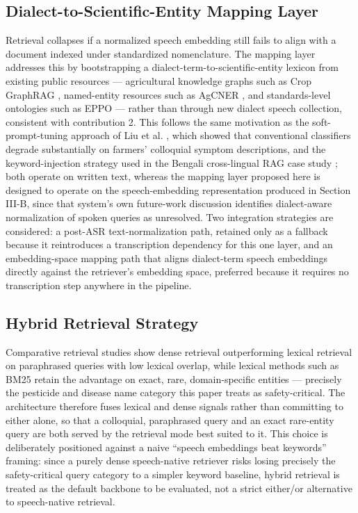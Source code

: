 \documentclass[conference]{IEEEtran}
\begin{document}
\subsection{Dialect-to-Scientific-Entity Mapping Layer}
Retrieval collapses if a normalized speech embedding still fails to align with a document indexed under standardized nomenclature. The mapping layer addresses this by bootstrapping a dialect-term-to-scientific-entity lexicon from existing public resources --- agricultural knowledge graphs such as Crop GraphRAG \cite{wu2026cropgraphrag}, named-entity resources such as AgCNER \cite{yao2024agcner}, and standards-level ontologies such as EPPO \cite{kgeditorial2023} --- rather than through new dialect speech collection, consistent with contribution 2. This follows the same motivation as the soft-prompt-tuning approach of Liu et al. \cite{liu2025colloquialpest}, which showed that conventional classifiers degrade substantially on farmers' colloquial symptom descriptions, and the keyword-injection strategy used in the Bengali cross-lingual RAG case study \cite{hossain2026bengalirag}; both operate on written text, whereas the mapping layer proposed here is designed to operate on the speech-embedding representation produced in Section III-B, since that system's own future-work discussion identifies dialect-aware normalization of spoken queries as unresolved. Two integration strategies are considered: a post-ASR text-normalization path, retained only as a fallback because it reintroduces a transcription dependency for this one layer, and an embedding-space mapping path that aligns dialect-term speech embeddings directly against the retriever's embedding space, preferred because it requires no transcription step anywhere in the pipeline.

\subsection{Hybrid Retrieval Strategy}
Comparative retrieval studies show dense retrieval outperforming lexical retrieval on paraphrased queries with low lexical overlap, while lexical methods such as BM25 retain the advantage on exact, rare, domain-specific entities \cite{sultania2024hybridsearch} --- precisely the pesticide and disease name category this paper treats as safety-critical. The architecture therefore fuses lexical and dense signals rather than committing to either alone, so that a colloquial, paraphrased query and an exact rare-entity query are both served by the retrieval mode best suited to it. This choice is deliberately positioned against a naive ``speech embeddings beat keywords'' framing: since a purely dense speech-native retriever risks losing precisely the safety-critical query category to a simpler keyword baseline, hybrid retrieval is treated as the default backbone to be evaluated, not a strict either/or alternative to speech-native retrieval.
\end{document}
